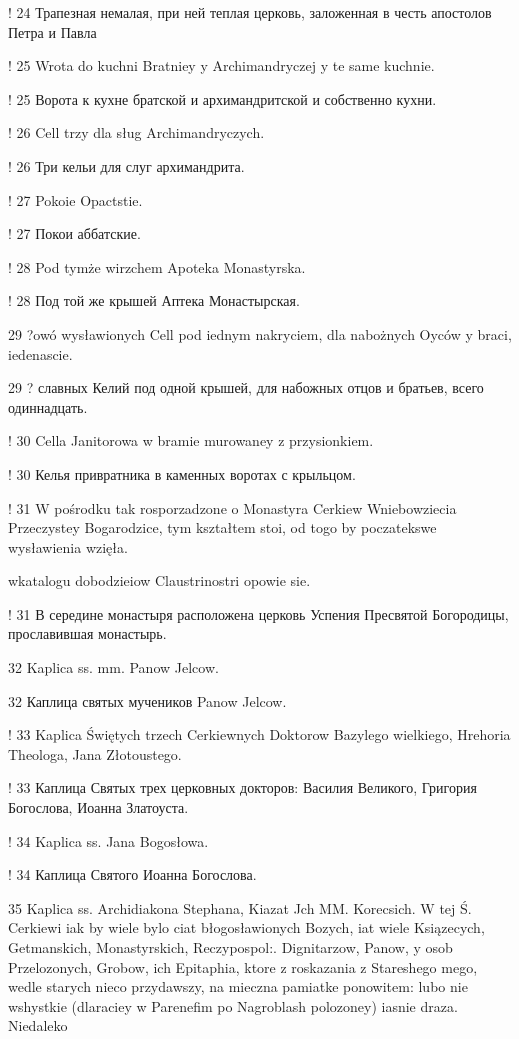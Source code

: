 ! 24 Трапезная немалая, при ней теплая церковь, заложенная в честь апостолов Петра и Павла


! 25 Wrota do kuchni Bratniey y Archimandryczej y te same kuchnie.

! 25 Ворота к кухне братской и архимандритской и собственно кухни.


! 26 Cell trzy dla sług Archimandryczych.

! 26 Три кельи для слуг архимандрита.

! 27 Pokoie Opactstie.

! 27 Покои аббатские.

! 28 Pod tymże wirzchem Apoteka Monastyrska.

! 28 Под той же крышей Аптека Монастырская.

29 ?owó wysławionych Cell pod iednym nakryciem, dla nabożnych Oyców y braci, iedenascie.

29 ? славных Келий под одной крышей, для набожных отцов и братьев, всего одиннадцать.

! 30 Cella Janitorowa w bramie murowaney z przysionkiem.

! 30 Келья привратника в каменных воротах с крыльцом.

! 31 W pośrodku tak rosporzadzone o Monastyra Cerkiew Wniebowziecia Przeczystey Bogarodzice, tym kształtem stoi, od togo by poczatekswe wysławienia wzięła.

wkatalogu dobodzieiow Claustrinostri opowie sie.

! 31 В середине монастыря расположена церковь Успения Пресвятой Богородицы, прославившая монастырь.

32 Kaplica ss. mm. Panow Jelcow.

32 Каплица святых мучеников Panow Jelcow.

! 33 Kaplica Świętych trzech Cerkiewnych Doktorow Bazylego wielkiego, Hrehoria Theologa, Jana Złotoustego.

! 33 Каплица Святых трех церковных докторов: Василия Великого, Григория Богослова, Иоанна Златоуста.

! 34 Kaplica ss. Jana Bogosłowa.

! 34 Каплица Святого Иоанна Богослова.

35 Kaplica ss. Archidiakona Stephana, Kiazat Jch MM. Korecsich. W tej Ś. Cerkiewi iak by wiele 
bylo ciat błogosławionych Bozych, iat wiele Ksiązecych, Getmanskich, Monastyrskich, Reczypospol:. Dignitarzow, Panow, y osob Przelozonych, Grobow, ich Epitaphia, ktore z roskazania z Stareshego mego, wedle starych nieco przydawszy, na mieczna pamiatke ponowitem: lubo nie wshystkie (dlaraciey w Parenefim po Nagroblash polozoney) iasnie draza. Niedaleko

